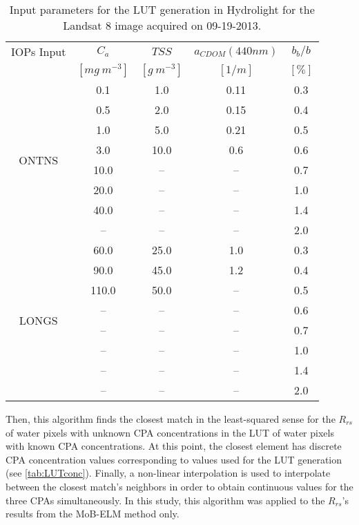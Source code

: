 \documentclass[draft]{spie}  %
\begin{document}
\begin{table}[htb]
\caption{Input parameters for the LUT generation in Hydrolight for the Landsat 8 image acquired on 09-19-2013. \label{tab:LUTconc}} 
\vspace{.07cm}
\small
\centering
    \begin{tabular}{ccccc}
    \hline \hline
            IOPs Input & \bfseries{$C_a$} & \bfseries{$TSS$} & \bfseries{$a_{CDOM}(440nm)$} & \bfseries{$b_b/b$}    \\
                   & $[mg~m^{-3}]$        & $[g~m^{-3}]$       &  $[1/m]$           & $[\%]$            \\ \hline \hline
\multirow{8}{*}{ONTNS}  &  0.1    	& 1.0     &  0.11   &  0.3  \\
   	&  0.5    	& 2.0   &  0.15   	&  0.4  \\
    &  1.0    	& 5.0   &  0.21   	&  0.5  \\
    &  3.0    	& 10.0  &  0.6    	&  0.6  \\ 
    &  10.0     & --    &  --   	&  0.7  \\  
    &  20.0     & --    &  --   	&  1.0  \\  
    &  40.0     & --    &  --   	&  1.4  \\
    &  --       & --    &  --   	&  2.0  \\ \hline

\multirow{8}{*}{LONGS}   &  60.0   & 25.0    &  1.0    &  0.3  \\
    &  90.0   & 45.0    &  1.2    &  0.4  \\
    &  110.0  & 50.0    &  --     &  0.5  \\
    &  --     & --      &  --     &  0.6  \\  
    &  --     & --      &  --     &  0.7  \\  
    &  --     & --      &  --     &  1.0  \\   
    &  --     & --      &  --     &  1.4  \\  
    &  --     & --      &  --     &  2.0  \\  \hline \hline
    \end{tabular}
  \end{table}

Then, this algorithm finds the closest match in the least-squared sense for the $R_{rs}$ of water pixels with unknown CPA concentrations in the LUT of water pixels with known CPA concentrations. At this point, the closest element has discrete CPA concentration values corresponding to values used for the LUT generation (see \autoref{tab:LUTconc}). Finally, a non-linear interpolation is used to interpolate between the closest match's neighbors in order to obtain continuous values for the three CPAs simultaneously. In this study, this algorithm was applied to the $R_{rs}$'s results from the MoB-ELM method only.
\end{document}
